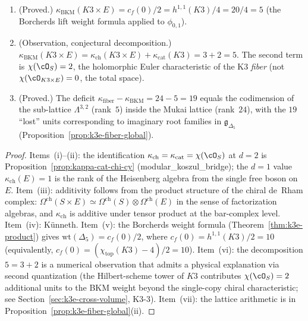 \begin{proposition}
\begin{enumerate}[label=\textup{(\roman*)}]
 \item \textup{(Proved.)} $\kappa_{\mathrm{BKM}}(K3 \times E) = c_f(0)/2 = h^{1,1}(K3)/4 = 20/4 = 5$ (the Borcherds lift weight formula applied to $\phi_{0,1}$).

 \item \textup{(Observation, conjectural decomposition.)} $\kappa_{\mathrm{BKM}}(K3 \times E) = \kappa_{\mathrm{ch}}(K3 \times E) + \kappa_{\mathrm{cat}}(K3) = 3 + 2 = 5$.  The second term is $\chi(\cO_S) = 2$, the holomorphic Euler characteristic of the K3 \emph{fiber} (not $\chi(\cO_{K3 \times E}) = 0$, the total space).

 \item \textup{(Proved.)} The deficit $\kappa_{\mathrm{fiber}} - \kappa_{\mathrm{BKM}} = 24 - 5 = 19$ equals the codimension of the sub-lattice $\Lambda^{3,2}$ (rank~$5$) inside the Mukai lattice (rank~$24$), with the $19$ ``lost'' units corresponding to imaginary root families in $\mathfrak{g}_{\Delta_5}$ (Proposition~\textup{\ref{prop:k3e-fiber-global}}).
\end{enumerate}
\end{proposition}

\begin{proof}
Items~(i)--(ii): the identification $\kappa_{\mathrm{ch}} = \kappa_{\mathrm{cat}} = \chi(\cO_S)$ at $d = 2$ is Proposition~\ref{prop:kappa-cat-chi-cy} (modular\_koszul\_bridge); the $d = 1$ value $\kappa_{\mathrm{ch}}(E) = 1$ is the rank of the Heisenberg algebra from the single free boson on $E$.  Item~(iii): additivity follows from the product structure of the chiral de~Rham complex: $\Omega^{\mathrm{ch}}(S \times E) \simeq \Omega^{\mathrm{ch}}(S) \otimes \Omega^{\mathrm{ch}}(E)$ in the sense of factorization algebras, and $\kappa_{\mathrm{ch}}$ is additive under tensor product at the bar-complex level.  Item~(iv): K\"unneth.  Item~(v): the Borcherds weight formula (Theorem~\ref{thm:k3e-product}) gives $\mathrm{wt}(\Delta_5) = c_f(0)/2$, where $c_f(0) = h^{1,1}(K3)/2 = 10$ (equivalently, $c_f(0) = (\chi_{\mathrm{top}}(K3) - 4)/2 = 10$).  Item~(vi): the decomposition $5 = 3 + 2$ is a numerical observation that admits a physical explanation via second quantization (the Hilbert-scheme tower of $K3$ contributes $\chi(\cO_S) = 2$ additional units to the BKM weight beyond the single-copy chiral characteristic; see Section~\ref{sec:k3e-cross-volume}, K3-3).  Item~(vii): the lattice arithmetic is in Proposition~\ref{prop:k3e-fiber-global}(ii).
\end{proof}

